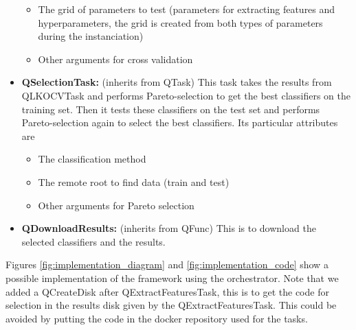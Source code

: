 \documentclass[10pt, conference, compsocconf]{IEEEtran}
\begin{document}
\begin{itemize}
\begin{itemize}
  \item The grid of parameters to test (parameters for extracting features and hyperparameters, the grid is created from both types of parameters during the instanciation)
  \item Other arguments for cross validation
  \end{itemize}
\item \textbf{QSelectionTask:} (inherits from QTask) This task takes the results from QLKOCVTask and performs Pareto-selection to get the best classifiers on the training set. Then it tests these classifiers on the test set and performs Pareto-selection again to select the best classifiers.
  Its particular attributes are
  \begin{itemize}
  \item The classification method
  \item The remote root to find data (train and test)
  \item Other arguments for Pareto selection
  \end{itemize}
\item \textbf{QDownloadResults:} (inherits from QFunc) This is to download the selected classifiers and the results.
\end{itemize}
Figures \ref{fig:implementation_diagram} and \ref{fig:implementation_code} show a possible implementation of the framework using the orchestrator. Note that we added a QCreateDisk after QExtractFeaturesTask, this is to get the code for selection in the results disk given by the QExtractFeaturesTask. This could be avoided by putting the code in the docker repository used for the tasks.
\end{document}
